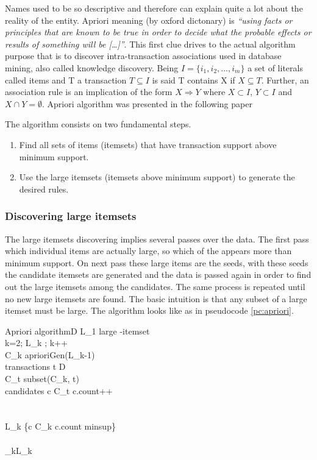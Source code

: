 Names used to be so descriptive and therefore can explain quite a lot about the
reality of the entity. Apriori meaning (by oxford dictonary) is {\it “using facts or
principles that are known to be true in order to decide what the probable
effects or results of something will be [\dots]”}. This first clue drives to the
actual algorithm purpose that is to discover intra-transaction associations used
in database mining, also called knowledge discovery.
Being $I=\{i_{1}, i_{2}, \dots,i_{m}\}$ a set of literals called items and T a
transaction $T \subseteq I$ is said T contains X if $X \subseteq T$. Further, an
association rule is an implication of the form $X \Rightarrow Y$ where $X
\subset I$, $Y \subset I$ and $X \cap Y = \emptyset$. Apriori algorithm was
presented in the following paper \cite{agrawalfast}

The algorithm consists on two fundamental steps.
\begin{enumerate}
  \item Find all sets of items (itemsets) that have transaction support above
    minimum support.
  \item Use the large itemsets (itemsets above minimum support) to generate the
    desired rules.
\end{enumerate}

\subsubsection{Discovering large itemsets}

The large itemsets discovering implies several passes over the data. The first
pass which individual items are actually large, so which of the appears more
than minimum support. On next pass these large items are the seeds, with these
seeds the candidate itemsets are generated and the data is passed again in order 
to find out the large itemsets among the candidates. The same process is repeated 
until no new large itemsets are found. The basic intuition is that any subset of
a large itemset must be large. The algorithm looks like as in pseudocode
\ref{pc:apriori}.

\begin{pseudocode}{Apriori algorithm}{D}
\label{pc:apriori}
    L_{1} \GETS large -itemset
	\\
    \FOR k=2; L_{k} \neq \emptyset; k++ \DO
	\BEGIN
         \\
        C_{k} \GETS aprioriGen(L_{k-1})\\
        \FORALL transactions \quad t \in D \DO
        \BEGIN
             \\
            C_{t} \GETS subset(C_{k}, t)\\
            \FORALL candidates \quad c \in C_{t} \DO
            \BEGIN
                c.count++\\
            \END\\
        \END\\
        L_{k} \GETS \{c \in C_{k} \mid c.count \geq minsup\}
	\END\\
	\\

    \RETURN \bigcup_{k}L_{k}
\end{pseudocode}

